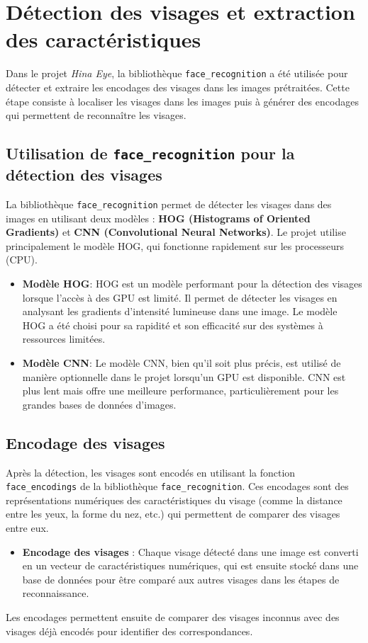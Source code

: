 \documentclass[a4paper,12pt]{report}
\begin{document}
\section{Détection des visages et extraction des caractéristiques}
Dans le projet \textit{Hina Eye}, la bibliothèque \texttt{face\_recognition} a été utilisée pour détecter et extraire les encodages des visages dans les images prétraitées. Cette étape consiste à localiser les visages dans les images puis à générer des encodages qui permettent de reconnaître les visages.

\subsection{Utilisation de \texttt{face\_recognition} pour la détection des visages}
La bibliothèque \texttt{face\_recognition} permet de détecter les visages dans des images en utilisant deux modèles : \textbf{HOG (Histograms of Oriented Gradients)} et \textbf{CNN (Convolutional Neural Networks)}. Le projet utilise principalement le modèle HOG, qui fonctionne rapidement sur les processeurs (CPU).
\begin{itemize}
    \item \textbf{Modèle HOG}: HOG est un modèle performant pour la détection des visages lorsque l’accès à des GPU est limité. Il permet de détecter les visages en analysant les gradients d'intensité lumineuse dans une image. Le modèle HOG a été choisi pour sa rapidité et son efficacité sur des systèmes à ressources limitées.
    \item \textbf{Modèle CNN}: Le modèle CNN, bien qu'il soit plus précis, est utilisé de manière optionnelle dans le projet lorsqu'un GPU est disponible. CNN est plus lent mais offre une meilleure performance, particulièrement pour les grandes bases de données d'images.
\end{itemize}

\subsection{Encodage des visages}
Après la détection, les visages sont encodés en utilisant la fonction \texttt{face\_encodings} de la bibliothèque \texttt{face\_recognition}. Ces encodages sont des représentations numériques des caractéristiques du visage (comme la distance entre les yeux, la forme du nez, etc.) qui permettent de comparer des visages entre eux.
\begin{itemize}
    \item \textbf{Encodage des visages} : Chaque visage détecté dans une image est converti en un vecteur de caractéristiques numériques, qui est ensuite stocké dans une base de données pour être comparé aux autres visages dans les étapes de reconnaissance.
\end{itemize}
Les encodages permettent ensuite de comparer des visages inconnus avec des visages déjà encodés pour identifier des correspondances.
\end{document}
